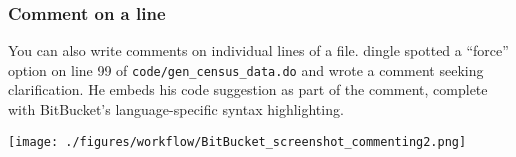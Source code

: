\subsubsection{Comment on a line}
You can also write comments on individual lines of a file.
dingle spotted a ``force'' option on line 99 of \texttt{code/gen\_census\_data.do} and wrote a comment seeking clarification.
He embeds his code suggestion as part of the comment, complete with BitBucket's language-specific syntax highlighting.
\begin{center}\texttt{[image: ./figures/workflow/BitBucket\_screenshot\_commenting2.png]}\end{center}

